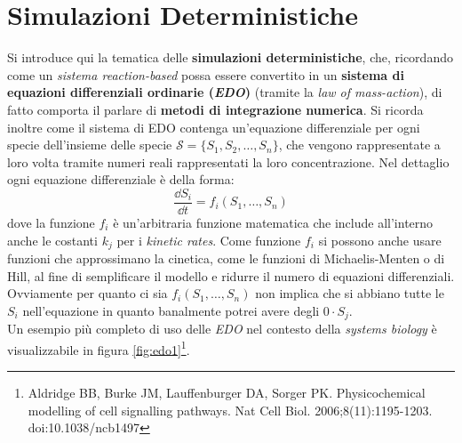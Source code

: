 \documentclass[a4paper,12pt, oneside]{book}
\begin{document}
\section{Simulazioni Deterministiche}
Si introduce qui la tematica delle \textbf{simulazioni deterministiche}, che,
ricordando come un \textit{sistema reaction-based} possa essere convertito in un
\textbf{sistema di equazioni differenziali ordinarie (\textit{EDO})} (tramite la
\textit{law of mass-action}), di fatto comporta il parlare di \textbf{metodi di
  integrazione numerica}. Si ricorda inoltre come il sistema di EDO contenga
un'equazione differenziale per ogni specie dell'insieme delle specie
$\mathcal{S} = \{S_1,S_2,\ldots, S_n\}$, che vengono rappresentate a loro volta
tramite numeri reali 
rappresentati la loro concentrazione. Nel dettaglio ogni equazione differenziale
è della forma:
\[\frac{\dd{S_i}}{\dd{t}}=f_i(S_1,\ldots,S_n)\]
dove la funzione $f_i$ è un'arbitraria funzione matematica che include
all'interno anche le costanti $k_j$ per i \textit{kinetic rates}. Come funzione
$f_i$ 
si possono anche usare funzioni che approssimano la cinetica, come le funzioni
di Michaelis-Menten o di Hill, al fine di semplificare il modello e ridurre il
numero di equazioni differenziali. Ovviamente per quanto ci sia
$f_i(S_1,\ldots,S_n)$ non implica che si abbiano tutte le $S_i$ nell'equazione
in quanto banalmente potrei avere degli $0\cdot S_j$.\\
Un esempio più completo di uso delle \textit{EDO} nel contesto della
\textit{systems biology} è visualizzabile in figura 
\ref{fig:edo1}\footnote{Aldridge BB, Burke JM, Lauffenburger DA, Sorger
  PK. Physicochemical modelling of cell signalling pathways. Nat Cell
  Biol. 2006;8(11):1195-1203. doi:10.1038/ncb1497}.
\end{document}
